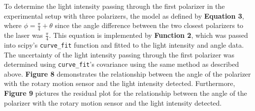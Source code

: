 \documentclass[
	letterpaper, %
	10pt, %
]{CSUniSchoolLabReport}
\begin{document}
To determine the light intensity passing through the first polarizer in the experimental setup with
three polarizers, the model as defined by \textbf{Equation 3}, where $\phi = \frac{\pi}{4} + \theta$ since the
angle difference between the two closest polarizers to the laser was $\frac{\pi}{4}$. This equation is
implemented by \textbf{Function 2}, which was passed into scipy's \lstinline{curve_fit} function and fitted
to the light intensity and angle data. The uncertainty of the
light intensity passing through the first polarizer was determined using \lstinline{curve_fit}'s
covariance using the same method as described above. \textbf{Figure 8} demonstrates the relationship between
the angle of the polarizer with the rotary motion sensor and the light intensity detected. Furthermore,
\textbf{Figure 9} pictures the residual plot for the relationship between the angle of the polarizer with the rotary
motion sensor and the light intensity detected.\\
\end{document}

